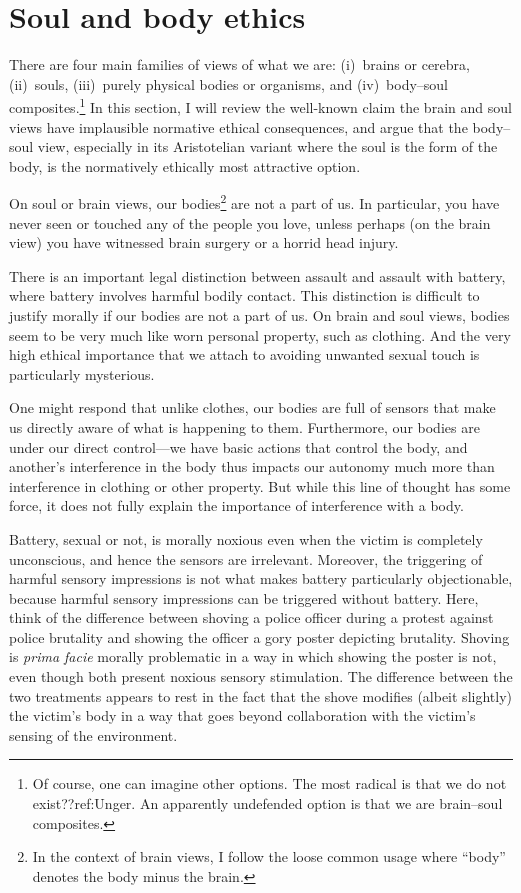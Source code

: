 \section{Soul and body ethics}
There are four main families of views of what we are: (i)~brains or cerebra, (ii)~souls, (iii)~purely physical bodies or organisms, and 
(iv)~body--soul composites.\footnote{Of course, one can imagine other options. The most radical is that we do not 
exist??ref:Unger. An apparently undefended option is that we are brain--soul composites.} In this section, I will review 
the well-known claim the brain and soul views have implausible normative ethical consequences, and argue that the body--soul view,
especially in its Aristotelian variant where the soul is the form of the body, is the normatively ethically most attractive option.

On soul or brain views, our bodies\footnote{In the context of brain views, I follow the loose common usage
where ``body'' denotes the body minus the brain.} are not a part of us. In particular, you have never seen 
or touched any of the people you love, unless perhaps (on the brain view) you have witnessed brain surgery or 
a horrid head injury. 

There is an important legal distinction between assault and assault with battery, where
battery involves harmful bodily contact. This distinction is difficult to justify morally
if our bodies are not a part of us. On brain and soul views, bodies seem to be very much 
like worn personal property, such as clothing. And the very high ethical importance that we 
attach to avoiding unwanted sexual touch is particularly mysterious.

One might respond that unlike clothes, our bodies are full of sensors that make us directly
aware of what is happening to them. Furthermore, our bodies are under our direct control---we have 
basic actions that control the body, and another's interference in the body thus impacts our 
autonomy much more than interference in clothing or other property. But while this line of thought
has some force, it does not fully explain the importance of interference with a body. 

Battery, sexual or not, is morally noxious even when the victim is completely unconscious, and 
hence the sensors are irrelevant. Moreover, the triggering of harmful sensory impressions
is not what makes battery particularly objectionable, because harmful sensory impressions can 
be triggered without battery. Here, think of the difference between shoving a police officer 
during a protest against police brutality and showing the officer a gory poster depicting 
brutality. Shoving is \textit{prima facie} morally problematic in a way in which showing 
the poster is not, even though both present noxious sensory stimulation. The difference between 
the two treatments appears to rest in the fact that the shove modifies (albeit slightly) the victim's body 
in a way that goes beyond collaboration with the victim's sensing of the environment.

